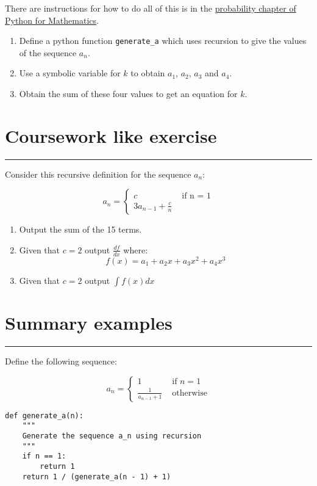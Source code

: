 \documentclass{article}
\begin{document}
There are instructions for how to do all of this is in the
\href{https://vknight.org/pfm/tools-for-mathematics/07-sequences/how/main.html}{probability chapter of Python for Mathematics}.


\begin{enumerate}
    \item Define a python function \texttt{generate_a} which uses
        recursion to give the values of the sequence \(a_n\).
    \item Use a symbolic variable for \(k\) to obtain $a_1$, $a_2$, $a_3$ and
        $a_4$.
    \item Obtain the sum of these four values to get an equation for \(k\).
\end{enumerate}


\section{Coursework like exercise}
\hrule

Consider this recursive definition for the sequence $a_n$:

$$
a_n = \begin{cases}
        c & \text{ if n = 1}\\
        3a_{n - 1} + \frac{c}{n}
      \end{cases}
$$


\begin{enumerate}
    \item Output the sum of the 15 terms.
    \item Given that $c=2$ output $\frac{df}{dx}$ where:
             $$
             f(x) = a_1 + a_2 x + a_3 x ^ 2 + a_4 x ^ 3
             $$
    \item Given that $c=2$ output $\int f(x)dx$
\end{enumerate}


\section{Summary examples}
\hrule

    Define the following sequence:

    \[
        a_n = \begin{cases}
                1 & \text{ if }n=1\\
                \frac{1}{a_{n - 1} + 1}&\text{ otherwise}
              \end{cases}
    \]

        \begin{verbatim}
def generate_a(n):
    """
    Generate the sequence a_n using recursion
    """
    if n == 1:
        return 1
    return 1 / (generate_a(n - 1) + 1)
    \end{verbatim}
\end{document}
